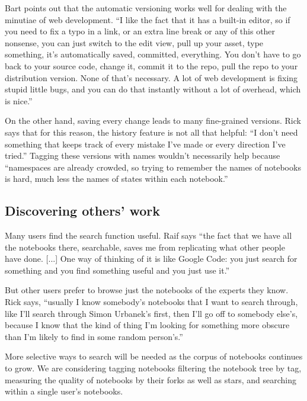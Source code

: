 Bart points out that the automatic versioning works well for dealing with the
minutiae of web development. ``I like the fact that it has a built-in editor, so
if you need to fix a typo in a link, or an extra line break or any of this other
nonsense, you can just switch to the edit view, pull up your asset, type
something, it's automatically saved, committed, everything. You don't have to go
back to your source code, change it, commit it to the repo, pull the repo to
your distribution version. None of that's necessary. A lot of web development is
fixing stupid little bugs, and you can do that instantly without a lot of
overhead, which is nice.''

On the other hand, saving every change leads to many fine-grained
versions. Rick says that for this reason, the history feature is not all that
helpful: ``I don't need something that keeps track of every mistake I've made or
every direction I've tried.'' Tagging these versions with names wouldn't
necessarily help because ``namespaces are already crowded, so trying to remember
the names of notebooks is hard, much less the names of states within each
notebook.''


\subsection{Discovering others' work}
Many users find the search function useful. Raif says ``the fact that we have
all the notebooks there, searchable, saves me from replicating what other people
have done. [...] One way of thinking of it is like Google Code: you just search
for something and you find something useful and you just use it.''

But other users prefer to browse just the notebooks of the experts they
know. Rick says, ``usually I know somebody's notebooks that I want to search
through, like I'll search through Simon Urbanek's first, then I'll go off to
somebody else's, because I know that the kind of thing I'm looking for something
more obscure than I'm likely to find in some random person's.''

More selective ways to search will be needed as the corpus of notebooks
continues to grow. We are considering tagging notebooks filtering the notebook
tree by tag, measuring the quality of notebooks by their forks as well as stars,
and searching within a single user's notebooks.


